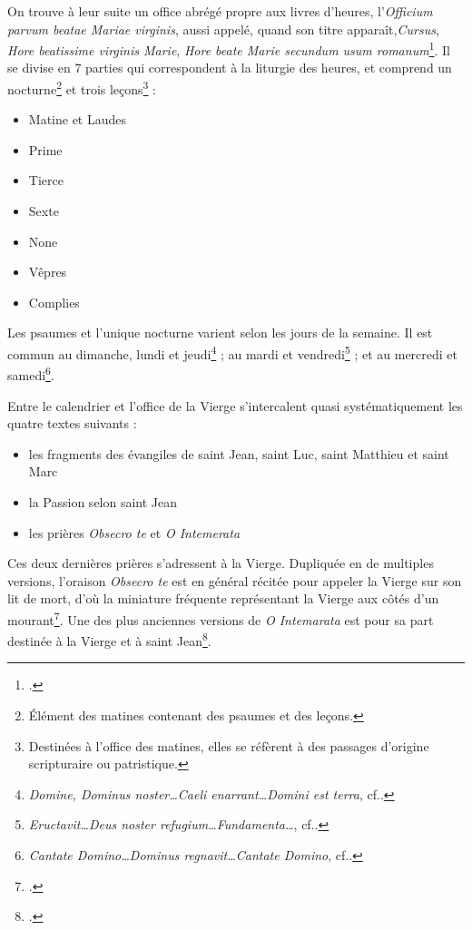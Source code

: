 \documentclass[a4paper,12pt,twoside]{book}
\begin{document}
	On trouve à leur suite un office abrégé propre aux livres d'heures, l'\textit{Officium parvum beatae Mariae virginis}, aussi appelé, quand son titre apparaît,\textit{Cursus}, \textit{Hore beatissime virginis Marie}, \textit{Hore beate Marie secundum usum romanum}\footcite[p. XVII]{Leroquais_notices}. Il se divise en 7 parties qui correspondent à la liturgie des heures, et comprend un nocturne\footnote{Élément des matines contenant des psaumes et des leçons.} et trois leçons\footnote{Destinées à l'office des matines, elles se réfèrent à des passages d'origine scripturaire ou patristique.} :
	\begin{itemize}
	    \item Matine et Laudes
	    \item Prime
	    \item Tierce
	    \item Sexte
	    \item None
	    \item Vêpres
	    \item Complies
	\end{itemize}
	Les psaumes et l'unique nocturne varient selon les jours de la semaine. Il est commun au dimanche, lundi et jeudi\footnote{\textit{Domine, Dominus noster…Caeli enarrant…Domini est terra}, cf.\cite[p. XVII]{Leroquais_notices}.} ; au mardi et vendredi\footnote{\textit{Eructavit…Deus noster refugium…Fundamenta…}, cf.\cite[p. XVII]{Leroquais_notices}.} ; et au mercredi et samedi\footnote{\textit{Cantate Domino…Dominus regnavit…Cantate Domino}, cf.\cite[p. XVII]{Leroquais_notices}.}.
	
	Entre le calendrier et l'office de la Vierge s'intercalent quasi systématiquement les quatre textes suivants : 
	\begin{itemize}
	    \item les fragments des évangiles de saint Jean, saint Luc, saint Matthieu et saint Marc
	    \item la Passion selon saint Jean
	    \item les prières \textit{Obsecro te} et \textit{O Intemerata}
	\end{itemize}
	Ces deux dernières prières s'adressent à la Vierge. Dupliquée en de multiples versions, l'oraison \textit{Obsecro te} est en général récitée pour appeler la Vierge sur son lit de mort, d'où la miniature fréquente représentant la Vierge aux côtés d'un mourant\footcite[p. XXXIII-XXIV]{V_L}. Une des plus anciennes versions de \textit{O Intemarata} est pour sa part destinée à la Vierge et à saint Jean\footcite[p. XXV]{Leroquais_notices}.\\
	
\end{document}
